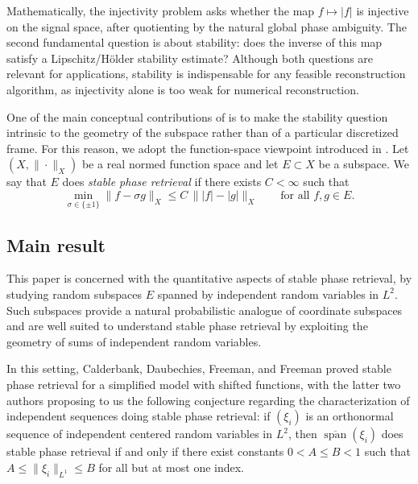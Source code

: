 \documentclass[11pt]{amsart}
\numberwithin{equation}{section}
\theoremstyle{definition}
\theoremstyle{remark}
\newcommand{\Span}{\operatorname{span}}
\newcommand{\abs}[1]{\lvert #1 \rvert}
\newcommand{\norm}[1]{\lVert #1 \rVert}
\begin{document}
Mathematically, the injectivity problem asks whether the map $f\mapsto |f|$ is injective on the signal space, after quotienting by the natural global phase ambiguity. The second fundamental question is about stability: does the inverse of this map satisfy a Lipschitz/H\"older stability estimate? Although both questions are relevant for applications, stability is indispensable for any feasible reconstruction algorithm, as injectivity alone is
too weak for numerical reconstruction.

One of the main conceptual contributions of 
\cite{calderbank2022stable,camunez2025characterization,christ2022examples,FOTP,garcia2025isometric,garcia2025existence} is to make the stability question intrinsic to the geometry of the
subspace rather than of a particular discretized frame.  For this reason, we adopt the function-space viewpoint introduced in
\cite{calderbank2022stable,FOTP}.  Let $(X,\|\cdot\|_X)$ be a real normed function space and let
$E\subset X$ be a subspace.  We say that $E$ does \emph{stable phase
retrieval} if there exists $C<\infty$ such that
\begin{equation}
\label{def:stable_pr}
\min_{\sigma\in\{\pm1\}}\norm{f-\sigma g}_X
\le C\,\norm{\abs{f}-\abs{g}}_X
\qquad\text{for all }f,g\in E.
\end{equation}
 
\subsection{Main result} This paper is concerned with the quantitative aspects of stable phase retrieval, by studying random subspaces $E$ spanned
by independent random variables in $L^2$. Such subspaces provide a natural probabilistic analogue of coordinate subspaces and are well suited to understand stable phase retrieval by exploiting the geometry of sums of independent random variables.

In
this setting, Calderbank, Daubechies, Freeman, and Freeman
\cite{calderbank2022stable} proved stable phase retrieval for a simplified model with shifted functions, with the latter two authors proposing to us the following conjecture regarding the characterization of independent sequences doing stable phase retrieval: if $(\xi_i)$ is an orthonormal sequence of independent centered
random variables in $L^2$, then $\overline{\Span}(\xi_i)$ does stable phase
retrieval if and only if there exist constants $0<A\le B<1$ such that
$A\le \norm{\xi_i}_{L^1}\le B$ for all but at most one index. 
\end{document}
